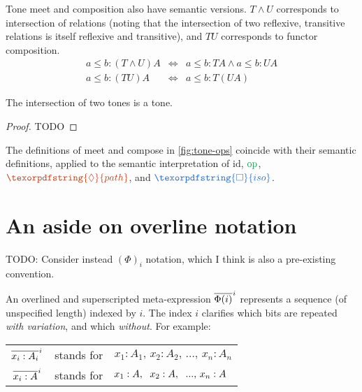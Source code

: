 \documentclass[ribbons]{rntz}
\newcommand{\todo}[1]{{\color{Purple}#1}}
\newcommand{\id}{\ensuremath{\textrm{id}}}
\newcommand{\op}{\ensuremath{\textrm{op}}}
\newcommand{\iso}{\ensuremath{\textrm{iso}}}     %
\renewcommand{\path}{\ensuremath{\textrm{path}}} %
\renewcommand{\iso}{\texorpdfstring{\ensuremath{\Box}}{iso}}
\renewcommand{\path}{\texorpdfstring{\ensuremath{\lozenge}}{path}}
\newcommand{\toneof}[2]{#1 #2}
\newcommand{\tmeet}{\wedge}                  %
\newcommand{\tm}{\id}                        %
\newcommand{\ta}{{\color{ForestGreen}\op}}   %
\newcommand{\ti}{{\color{NavyBlue}\iso}}     %
\newcommand{\tb}{{\color{Bittersweet}\path}} %
\begin{document}
Tone meet and composition also have semantic versions. $T \tmeet U$ corresponds
to intersection of relations (noting that the intersection of two reflexive,
transitive relations is itself reflexive and transitive), and $TU$ corresponds
to functor composition.
%
\begin{eqnarray*}
  a \le b : \toneof{(T \tmeet U)}{A} %
  &\iff& a \le b : \toneof{T}{A} \wedge a \le b : \toneof{U}{A}\\
  a \le b : \toneof{(TU)}{A} &\iff& a \le b : \toneof{T}{(\toneof{U}{A})}
\end{eqnarray*}

\begin{conjecture}
  The intersection of two tones is a tone.
\end{conjecture}
\begin{proof}
  \todo{TODO}
\end{proof}

\begin{conjecture}
  The definitions of meet and compose in \cref{fig:tone-ops} coincide with their
  semantic definitions, applied to the semantic interpretation of $\tm$, $\ta$,
  $\tb$, and $\ti$.
\end{conjecture}


\section{An aside on overline notation}

\newcommand{\xbar}[2]{\overline{#2}^{\hspace{.5pt}#1}}

\newcommand{\Expr}{\Phi}
\newcommand{\Ix}[1]{#1}
\newcommand{\Ex}{{x}}
\newcommand{\Ay}{{A}}

\todo{TODO: Consider instead $\left(\Expr\right)_i$ notation, which I think is
  also a pre-existing convention.}

An overlined and superscripted meta-expression $\xbar{i}{\Expr(i)}$ represents a
sequence (of unspecified length) indexed by $i$. The index $i$ clarifies which
bits are repeated \emph{with variation}, and which \emph{without}. For example:

\begin{center}
  \begin{tabular}{ccl}
    $\xbar{\Ix{i}}{\Ex_{\Ix{i}} : \Ay_{\Ix{i}}}$
    & stands for
    & $\Ex_{\Ix{1}} : \Ay_{\Ix{1}},\, \Ex_{\Ix{2}} : \Ay_{\Ix{2}},\, ...,\, \Ex_{\Ix{n}} : \Ay_{\Ix{n}}$
    \vspace{.5em}\\
    $\xbar{\Ix{i}}{\Ex_{\Ix{i}} : \Ay}$
    & stands for
    & $\Ex_{\Ix{1}} : \Ay,\hspace{0.6em} \Ex_{\Ix{2}} : \Ay,\hspace{0.6em} ...,\, \Ex_{\Ix{n}} : \Ay$
  \end{tabular}
\end{center}
\end{document}
